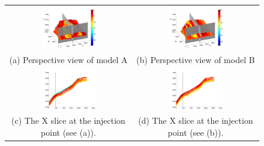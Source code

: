 \begin{figure}
\begin{tabular}{cc}
\includegraphics[width=0.45\textwidth]{./figurer/C02222_LogKy_pers}&
\includegraphics[width=0.45\textwidth]{./figurer/C03211_LogKy_pers}
\\(a) Perspective view of model A&(b) Perspective view of model B\\
\includegraphics[width=0.45\textwidth]{./figurer/C02222_LogKy_slcx}&
\includegraphics[width=0.45\textwidth]{./figurer/C03211_LogKy_slcx}
\\(c) The X slice at the injection point (see (a)).&
(d) The X slice at the injection point (see (b)).\\

\end{tabular}
\end{figure}
